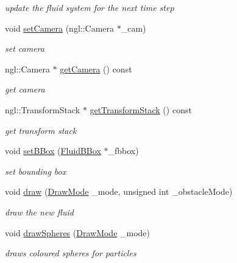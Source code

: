 \begin{DoxyCompactItemize}
\begin{DoxyCompactList}\small\item\em update the fluid system for the next time step \item\end{DoxyCompactList}\item 
void \hyperlink{classFluidSystem_a2301443220f5e3366016679325cbef9e}{setCamera} (ngl::Camera $\ast$\_\-cam)
\begin{DoxyCompactList}\small\item\em set camera \item\end{DoxyCompactList}\item 
ngl::Camera $\ast$ \hyperlink{classFluidSystem_a2b41f17fbf8fe86977323771e83c5531}{getCamera} () const 
\begin{DoxyCompactList}\small\item\em get camera \item\end{DoxyCompactList}\item 
ngl::TransformStack $\ast$ \hyperlink{classFluidSystem_a961c577b66bbe91d8cef8889a1b4a9b1}{getTransformStack} () const 
\begin{DoxyCompactList}\small\item\em get transform stack \item\end{DoxyCompactList}\item 
void \hyperlink{classFluidSystem_af1282b7bea50c3f1ff1c6173bd430002}{setBBox} (\hyperlink{classFluidBBox}{FluidBBox} $\ast$\_\-fbbox)
\begin{DoxyCompactList}\small\item\em set bounding box \item\end{DoxyCompactList}\item 
void \hyperlink{classFluidSystem_ab2e10707d179033c443eebb39f41ae6e}{draw} (\hyperlink{Common_8h_a9a325db332d24e6105fe3b48a94604c3}{DrawMode} \_\-mode, unsigned int \_\-obstacleMode)
\begin{DoxyCompactList}\small\item\em draw the new fluid \item\end{DoxyCompactList}\item 
void \hyperlink{classFluidSystem_a26bb00d14f54788b55f18135f653006b}{drawSpheres} (\hyperlink{Common_8h_a9a325db332d24e6105fe3b48a94604c3}{DrawMode} \_\-mode)
\begin{DoxyCompactList}\small\item\em draws coloured spheres for particles \item\end{DoxyCompactList}\item 

\end{DoxyCompactItemize}
